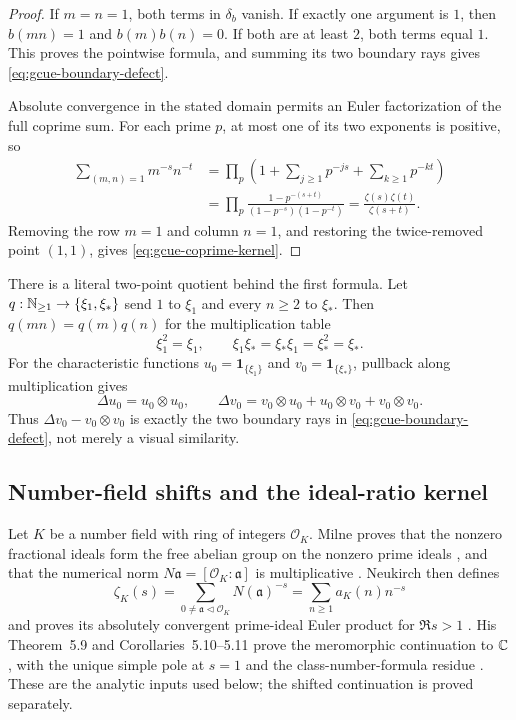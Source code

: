 \begin{proof}
If $m=n=1$, both terms in $\delta_b$ vanish.  If exactly one argument is $1$, then
$b(mn)=1$ and $b(m)b(n)=0$.  If both are at least $2$, both terms equal $1$.  This proves
the pointwise formula, and summing its two boundary rays gives
\eqref{eq:gcue-boundary-defect}.

Absolute convergence in the stated domain permits an Euler factorization of the full
coprime sum.  For each prime $p$, at most one of its two exponents is positive, so
\begin{align*}
 \sum_{(m,n)=1}m^{-s}n^{-t}
 &=\prod_p\left(1+\sum_{j\ge1}p^{-js}+\sum_{k\ge1}p^{-kt}\right)\\
 &=\prod_p\frac{1-p^{-(s+t)}}{(1-p^{-s})(1-p^{-t})}
 =\frac{\zeta(s)\zeta(t)}{\zeta(s+t)}.
\end{align*}
Removing the row $m=1$ and column $n=1$, and restoring the twice-removed point $(1,1)$,
gives \eqref{eq:gcue-coprime-kernel}.
\end{proof}

There is a literal two-point quotient behind the first formula.  Let
$q:\mathbb{N}_{\ge1}\to\{\xi_1,\xi_*\}$ send $1$ to $\xi_1$ and every $n\ge2$ to $\xi_*$.  Then
$q(mn)=q(m)q(n)$ for the multiplication table
\[
 \xi_1^2=\xi_1,\qquad \xi_1\xi_*=\xi_*\xi_1=\xi_*^2=\xi_*.
\]
For the characteristic functions
$u_0=\mathbf1_{\{\xi_1\}}$ and $v_0=\mathbf1_{\{\xi_*\}}$, pullback along multiplication
gives
\[
 \Delta u_0=u_0\otimes u_0,\qquad
 \Delta v_0=v_0\otimes u_0+u_0\otimes v_0+v_0\otimes v_0.
\]
Thus $\Delta v_0-v_0\otimes v_0$ is exactly the two boundary rays in
\eqref{eq:gcue-boundary-defect}, not merely a visual similarity.

\subsection{Number-field shifts and the ideal-ratio kernel}

Let $K$ be a number field with ring of integers $\mathcal O_K$.  Milne proves that the
nonzero fractional ideals form the free abelian group on the nonzero prime ideals
\cite[Chap.~3, p.~53, Thm.~3.20]{milneANT2020}, and that the numerical norm
$N\mathfrak a=[\mathcal O_K:\mathfrak a]$ is multiplicative
\cite[Chap.~4, pp.~69--70, Prop.~4.2(a)]{milneANT2020}.  Neukirch then defines
\[
 \zeta_K(s)=\sum_{0\ne\mathfrak a\lhd\mathcal O_K}N(\mathfrak a)^{-s}
 =\sum_{n\ge1}a_K(n)n^{-s}
\]
and proves its absolutely convergent prime-ideal Euler product for $\Re s>1$
\cite[Chap.~VII, \S5, p.~457, Def.~5.1 and Prop.~5.2]{neukirch1999}.  His
Theorem~5.9 and Corollaries~5.10--5.11 prove the meromorphic continuation to $\mathbb C$, with
the unique simple pole at $s=1$ and the class-number-formula residue
\cite[pp.~465--467]{neukirch1999}.  These are the analytic inputs used below; the shifted
continuation is proved separately.

